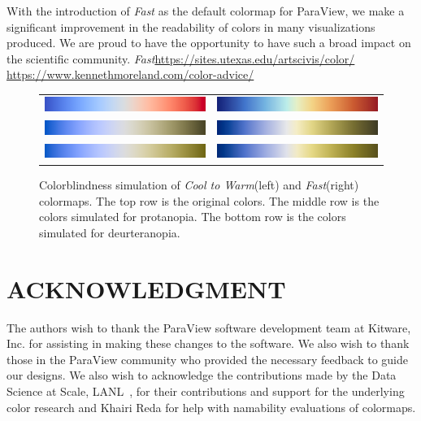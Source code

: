 \documentclass{IEEEcsmag}
\newcommand*{\colormap}[1]{\textsl{#1}\xspace}
\newcommand*{\coolwarm}{\colormap{Cool to Warm}}
\newcommand*{\fast}{\colormap{Fast}}
\providecommand{\DIFaddtex}[1]{{\protect\color{blue}\uwave{#1}}} %
\providecommand{\DIFaddbegin}{} %
\providecommand{\DIFaddend}{} %
\providecommand{\DIFadd}[1]{\texorpdfstring{\DIFaddtex{#1}}{#1}} %
\begin{document}
With the introduction of \fast as the default colormap for ParaView, we make a significant improvement in the readability of colors in many visualizations produced. We are proud to have the opportunity to have such a broad impact on the scientific community. \DIFaddbegin \fast \DIFadd{can be downloaded at: }\url{https://sites.utexas.edu/artscivis/color/} \DIFadd{or }\url{https://www.kennethmoreland.com/color-advice/}\DIFadd{.
}\DIFaddend 

\begin{figure}[htb]
  \centering
  \begin{tabular}{cc}
    \includegraphics[width=.44\linewidth, height=5mm]{map-cool-to-warm} & \includegraphics[width=.44\linewidth, height=5mm]{map-fast} \\
    \includegraphics[width=.44\linewidth, height=5mm]{map-protanopia-cool-to-warm} & \includegraphics[width=.44\linewidth, height=5mm]{map-protanopia-fast} \\
    \includegraphics[width=.44\linewidth, height=5mm]{map-deurteranopia-cool-to-warm} & \includegraphics[width=.44\linewidth, height=5mm]{map-deurteranopia-fast}
  \end{tabular}
  \caption{
    Colorblindness simulation of \coolwarm (left) and \fast (right) colormaps.
    The top row is the original colors.
    The middle row is the colors simulated for protanopia.
    The bottom row is the colors simulated for deurteranopia.
  }
  \label{fig:colorblindness}
\end{figure}

\section{ACKNOWLEDGMENT}

The authors wish to thank the ParaView software development team at Kitware, Inc. for assisting in making these changes to the software. We also wish to thank those in the ParaView community who provided the necessary feedback to guide our designs. We also wish to acknowledge the contributions made by the Data Science at Scale, LANL~\cite{SciVisColor}, for their contributions and support for the underlying color research and Khairi Reda for help with namability evaluations of colormaps.
\end{document}
